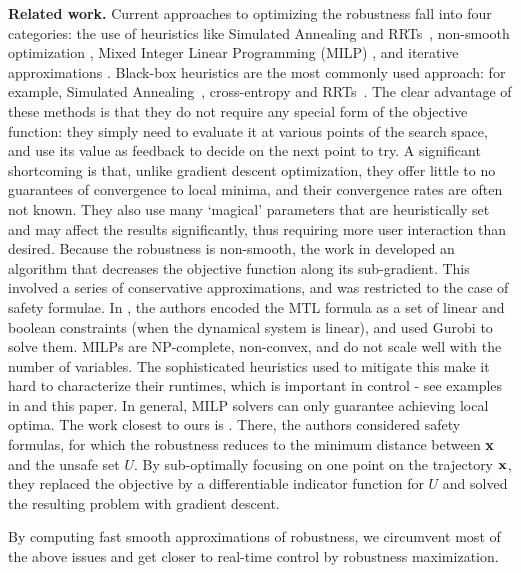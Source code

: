 \textbf{Related work.}
Current approaches to optimizing the robustness fall into four categories: 
the use of heuristics like Simulated Annealing and RRTs~\cite{NghiemSFIGP10hscc,AbbasF_HybridSA12,SankaranarayananF2012hscc,Dreossi15_RRTFalsification,Deshmukh15_IterativeApproaches}, 
non-smooth optimization \cite{AbbasF13acc}, 
Mixed Integer Linear Programming (MILP) \cite{Raman14_MPCSTL}, 
and iterative approximations \cite{AbbasATVA11_LinFalsification,Abbas14_MTLDescent}.
Black-box heuristics are the most commonly used approach: for example, Simulated Annealing~\cite{NghiemSFIGP10hscc}, cross-entropy \cite{SankaranarayananF2012hscc} and RRTs~\cite{Dreossi15_RRTFalsification}.
The clear advantage of these methods is that they do not require any special form of the objective function: they simply need to evaluate it at various points of the search space, and use its value as feedback to decide on the next point to try.
A significant shortcoming is that, unlike gradient descent optimization, they offer little to no guarantees of convergence to local minima, and their convergence rates are often not known. 
They also use many `magical' parameters that are heuristically set and may affect the results significantly, thus requiring more user interaction than desired.
Because the robustness is non-smooth, the work in \cite{AbbasF13acc} developed an algorithm that decreases the objective function along its sub-gradient. 
This involved a series of conservative approximations, and was restricted to the case of safety formulae.
In \cite{Raman14_MPCSTL}, the authors encoded the MTL formula as a set of linear and boolean constraints (when the dynamical system is linear), and used Gurobi to solve them.
MILPs are NP-complete, non-convex, and do not scale well with the number of variables. 
The sophisticated heuristics used to mitigate this make it hard to characterize their runtimes, which is important in control - see examples in \cite{Raman14_MPCSTL} and this paper. 
In general, MILP solvers can only guarantee achieving local optima.
The work closest to ours is \cite{AbbasATVA11_LinFalsification,Abbas14_MTLDescent}.
There, the authors considered safety formulas, for which the robustness reduces to the minimum distance between $\mathbf{x}$ and the unsafe set $U$.
By sub-optimally focusing on one point on the trajectory $\mathbf{x}$, they replaced the objective by a differentiable indicator function for $U$ and solved the resulting problem with gradient descent.

By computing fast smooth approximations of robustness, we circumvent most of the above issues and get closer to real-time control by robustness maximization.




